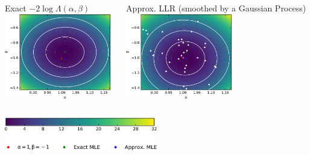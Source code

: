 \documentclass{beamer}
\begin{document}
\begin{frame}


    \begin{columns}
      \begin{column}[b]{0.48\textwidth}
        \centering
        \small Exact $-2 \log \Lambda(\alpha, \beta )$\\
        \vspace{0.5em}
        \includegraphics[height=10em]{figures/fig5a.pdf}
      \end{column}
      \begin{column}[b]{0.48\textwidth}
          \centering
          \small Approx. LLR (smoothed by a Gaussian Process)\\
          \vspace{0.5em}
          \includegraphics[height=10em]{figures/fig5c.pdf}
      \end{column}
    \end{columns}

    \vspace{1em}

    \centering
    \includegraphics[width=0.5\textwidth]{figures/fig5d.pdf}

\end{frame}
\end{document}
